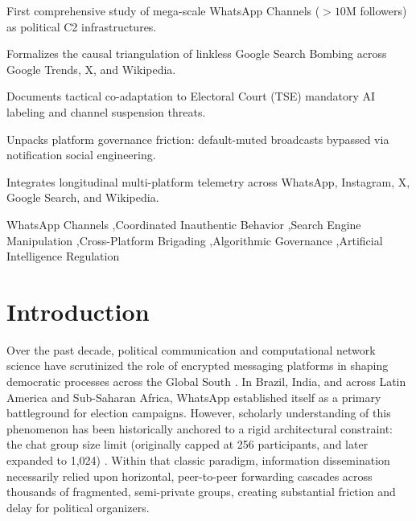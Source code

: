 \documentclass[preprint,12pt]{elsarticle}
\begin{document}
\begin{frontmatter}
\begin{highlights}
\item First comprehensive study of mega-scale WhatsApp Channels ($>10\text{M}$ followers) as political C2 infrastructures.
\item Formalizes the causal triangulation of linkless Google Search Bombing across Google Trends, X, and Wikipedia.
\item Documents tactical co-adaptation to Electoral Court (TSE) mandatory AI labeling and channel suspension threats.
\item Unpacks platform governance friction: default-muted broadcasts bypassed via notification social engineering.
\item Integrates longitudinal multi-platform telemetry across WhatsApp, Instagram, X, Google Search, and Wikipedia.
\end{highlights}

\begin{keyword}
WhatsApp Channels \sep Coordinated Inauthentic Behavior \sep Search Engine Manipulation \sep Cross-Platform Brigading \sep Algorithmic Governance \sep Artificial Intelligence Regulation
\end{keyword}

\end{frontmatter}


\section{Introduction}\label{sec:intro}

Over the past decade, political communication and computational network science have scrutinized the role of encrypted messaging platforms in shaping democratic processes across the Global South \cite{resende2019whatsapp,evangelista2019whatsapp}. In Brazil, India, and across Latin America and Sub-Saharan Africa, WhatsApp established itself as a primary battleground for election campaigns. However, scholarly understanding of this phenomenon has been historically anchored to a rigid architectural constraint: the chat group size limit (originally capped at 256 participants, and later expanded to 1,024) \cite{resende2019whatsapp}. Within that classic paradigm, information dissemination necessarily relied upon horizontal, peer-to-peer forwarding cascades across thousands of fragmented, semi-private groups, creating substantial friction and delay for political organizers.
\end{document}
